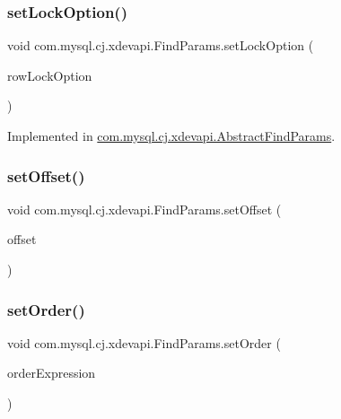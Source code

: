 \subsubsection{\texorpdfstring{set\+Lock\+Option()}{setLockOption()}}
{\footnotesize\ttfamily void com.\+mysql.\+cj.\+xdevapi.\+Find\+Params.\+set\+Lock\+Option (\begin{DoxyParamCaption}\item[{\mbox{\hyperlink{enumcom_1_1mysql_1_1cj_1_1xdevapi_1_1_find_params_1_1_row_lock_options}{Row\+Lock\+Options}}}]{row\+Lock\+Option }\end{DoxyParamCaption})}



Implemented in \mbox{\hyperlink{classcom_1_1mysql_1_1cj_1_1xdevapi_1_1_abstract_find_params_af4699947772c548ae743375658898d7e}{com.\+mysql.\+cj.\+xdevapi.\+Abstract\+Find\+Params}}.

\mbox{\label{interfacecom_1_1mysql_1_1cj_1_1xdevapi_1_1_find_params_ae6d56a9a12a24481232ca5dadd26d60b}} 
\subsubsection{\texorpdfstring{set\+Offset()}{setOffset()}}
{\footnotesize\ttfamily void com.\+mysql.\+cj.\+xdevapi.\+Find\+Params.\+set\+Offset (\begin{DoxyParamCaption}\item[{Long}]{offset }\end{DoxyParamCaption})}

\mbox{\label{interfacecom_1_1mysql_1_1cj_1_1xdevapi_1_1_find_params_ad7efa7cf04f9f7675d0f91c96a565704}} 
\subsubsection{\texorpdfstring{set\+Order()}{setOrder()}}
{\footnotesize\ttfamily void com.\+mysql.\+cj.\+xdevapi.\+Find\+Params.\+set\+Order (\begin{DoxyParamCaption}\item[{String...}]{order\+Expression }\end{DoxyParamCaption})}

